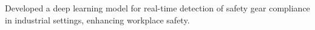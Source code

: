   {Developed a deep learning model for real-time detection of safety gear compliance in industrial settings, enhancing workplace safety.}

